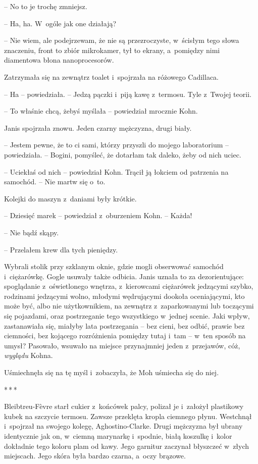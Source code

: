 \documentclass[oneside,polish,11pt,sfheadings]{mwbk}
\newcommand{\threeast}{\bigskip\par\centerline{*\,*\,*}\medskip\par}%
\begin{document}
-- No to je trochę zmniejsz.

-- Ha, ha. W~ogóle jak one działają?

-- Nie wiem, ale podejrzewam, że nie są przezroczyste, w~ścisłym tego
słowa znaczeniu, front to zbiór mikrokamer, tył to ekrany, a~pomiędzy
nimi diamentowa błona nanoprocesorów.

Zatrzymała się na zewnątrz toalet i~spojrzała na różowego Cadillaca.

-- Ha -- powiedziała. -- Jedzą pączki i~piją kawę z~termosu. Tyle z~Twojej
teorii.

-- To właśnie chcą, żebyś myślała -- powiedział mrocznie Kohn.

Janis spojrzała znowu. Jeden czarny mężczyzna, drugi biały.

-- Jestem pewne, że to ci sami, którzy przyszli do mojego laboratorium -- powiedziała. -- Bogini, pomyśleć, że dotarłam tak daleko, żeby od nich
uciec.

-- Uciekłaś od nich -- powiedział Kohn. Trącił ją łokciem od patrzenia na
samochód. -- Nie martw się o~to.

Kolejki do maszyn z~daniami były krótkie.

-- Dziesięć marek -- powiedział z~oburzeniem Kohn. -- Każda!

-- Nie bądź skąpy.

-- Przelałem krew dla tych pieniędzy.

Wybrali stolik przy szklanym oknie, gdzie mogli obserwować samochód i~ciężarówkę. Gogle usuwały także odbicia. Janis uznała to za
dezorientujące: spoglądanie z~oświetlonego wnętrza, z~kierowcami
ciężarówek jedzącymi szybko, rodzinami jedzącymi wolno, młodymi
wędrującymi dookoła oceniającymi, kto może być, albo nie użytkownikiem,
na zewnątrz z~zaparkowanymi lub toczącymi się pojazdami, oraz
postrzeganie tego wszystkiego w~jednej scenie. Jaki wpływ, zastanawiała
się, miałyby lata postrzegania -- bez cieni, bez odbić, prawie bez
ciemności, bez kojącego rozróżnienia pomiędzy tutaj i~tam -- w~ten sposób
na umysł? Pasowało, wsuwało na miejsce przynajmniej jeden z~przejawów,
cóż, \emph{wyglądu} Kohna.

Uśmiechnęła się na tę myśl i~zobaczyła, że Moh uśmiecha się do niej.
  \threeast 

Bleibtreu-Fèvre starł cukier z~końcówek palcy, polizał je i~założył
plastikowy kubek na szczycie termosu. Zawsze przeklęta kropla ciemnego
płynu. Westchnął i~spojrzał na swojego kolegę, Aghostino-Clarke. Drugi
mężczyzna był ubrany identycznie jak on, w~ciemną marynarkę i~spodnie,
białą koszulkę i~kolor dokładnie tego koloru plam od kawy. Jego garnitur
zaczynał błyszczeć w~złych miejscach. Jego skóra była bardzo czarna, a~oczy brązowe.
\end{document}
